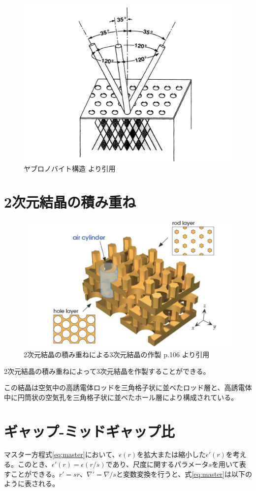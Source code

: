 \documentclass[platex,dvipdfmx,draft]{jsreport}
\numberwithin{equation}{section}
\begin{document}
\begin{figure}[htbp]
  \centering
  \includegraphics[width=0.6\linewidth]{yablonovite.png}
  \caption{ヤブロノバイト構造 \cite{orig}より引用}
  \label{fig:yablonovite}

\end{figure}


\section{2次元結晶の積み重ね}
\begin{figure}[htbp]
  \centering
  \includegraphics[width=0.6\linewidth]{2d.png}
  \caption{2次元結晶の積み重ねによる3次元結晶の作製 \cite{text} p.106 より引用}
  \label{fig:2d_3d}
\end{figure}
2次元結晶の積み重ねによって3次元結晶を作製することができる。

この結晶は空気中の高誘電体ロッドを三角格子状に並べたロッド層と、高誘電体中に円筒状の空気孔を三角格子状に並べたホール層により構成されている。

\section{ギャップ-ミッドギャップ比}
マスター方程式\ref{eq:master}において、$\epsilon(r)$を拡大または縮小した$\epsilon'(r)$を考える。このとき、$\epsilon'(r) = \epsilon(r / s)$であり、尺度に関するパラメータ$s$を用いて表すことができる。$r' = sr$、$\nabla' = \nabla / s$と変数変換を行うと、式\ref{eq:master}は以下のように表される。
\end{document}
